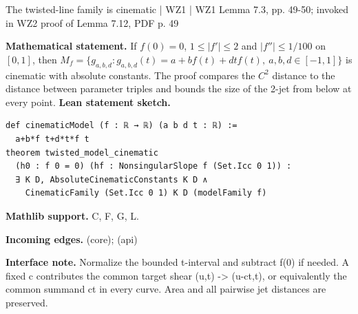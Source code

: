 \documentclass[10pt,a4paper]{article}
\newcommand{\nodecard}[1]{\hyperlink{node-#1}{\texttt{\detokenize{#1}}}}
\begin{document}
\begin{minipage}{\linewidth}
\hypertarget{node-L7_3}{}
\begin{tcolorbox}[colback=white,colframe=cinematicfg,colbacktitle=cinematicbg,coltitle=ink,boxrule=0.45pt,arc=1.6mm,left=3mm,right=3mm,top=2mm,bottom=2mm,title={\sffamily\bfseries WZ1 Lemma 7.3 \hfill \texttt{L7\_3}}]
{\sffamily\small\color{muted}The twisted-line family is cinematic | WZ1 | WZ1 Lemma 7.3, pp. 49-50; invoked in WZ2 proof of Lemma 7.12, PDF p. 49}\par
\textbf{Mathematical statement.} If $f(0)=0$, $1\le|f'|\le2$ and $|f''|\le1/100$ on $[0,1]$, then
$M_f=\{g_{a,b,d}:g_{a,b,d}(t)=a+bf(t)+dtf(t),\ a,b,d\in[-1,1]\}$
is cinematic with absolute constants.
The proof compares the $C^2$ distance to the distance between parameter triples and bounds the size of the 2-jet from below at every point.
\smallskip\textbf{Lean statement sketch.}
\begin{Verbatim}[fontsize=\small,breaklines=true,breakanywhere=true,tabsize=2]
def cinematicModel (f : ℝ → ℝ) (a b d t : ℝ) :=
  a+b*f t+d*t*f t
theorem twisted_model_cinematic
  (h0 : f 0 = 0) (hf : NonsingularSlope f (Set.Icc 0 1)) :
  ∃ K D, AbsoluteCinematicConstants K D ∧
    CinematicFamily (Set.Icc 0 1) K D (modelFamily f)
\end{Verbatim}
{\footnotesize\textbf{Mathlib support.} C, F, G, L.\par
\textbf{Incoming edges.} \nodecard{Dcinematic} (core); \nodecard{Icalc} (api)\par}
{\footnotesize\textbf{Interface note.} Normalize the bounded t-interval and subtract f(0) if needed. A fixed c contributes the common target shear (u,t) -> (u-ct,t), or equivalently the common summand ct in every curve. Area and all pairwise jet distances are preserved.}
\end{tcolorbox}\end{minipage}\par\medskip
\end{document}
